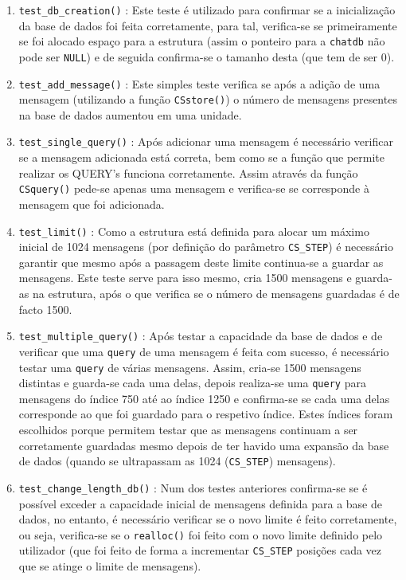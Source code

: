 \documentclass[a4paper]{article}
\begin{document}
	\begin{enumerate}
		\item \texttt{test\_db\_creation()} : Este teste é utilizado para confirmar se a inicialização da base de dados foi feita corretamente, para tal, verifica-se se primeiramente se foi alocado espaço para a estrutura (assim o ponteiro para a \texttt{chatdb} não pode ser \texttt{NULL}) e de seguida confirma-se o tamanho desta (que tem de ser 0). 
		\item \texttt{test\_add\_message()} : Este simples teste verifica se após a adição de uma mensagem (utilizando a função \texttt{CSstore()}) o número de mensagens presentes na base de dados aumentou em uma unidade. 
		\item \texttt{test\_single\_query()} : Após adicionar uma mensagem é necessário verificar se a mensagem adicionada está correta, bem como se a função que permite realizar os QUERY's funciona corretamente. Assim através da função \texttt{CSquery()} pede-se apenas uma mensagem e verifica-se se corresponde à mensagem que foi adicionada. 
		\item \texttt{test\_limit()} : Como a estrutura está definida para alocar um máximo inicial de 1024 mensagens (por definição do parâmetro \texttt{CS\_STEP}) é necessário garantir que mesmo após a passagem deste limite continua-se a guardar as mensagens. Este teste serve para isso mesmo, cria 1500 mensagens e guarda-as na estrutura, após o que verifica se o número de mensagens guardadas é de facto 1500. 
		\item \texttt{test\_multiple\_query()} : Após testar a capacidade da base de dados e de verificar que uma \texttt{query} de uma mensagem é feita com sucesso, é necessário testar uma \texttt{query} de várias mensagens. Assim, cria-se 1500 mensagens distintas e guarda-se cada uma delas, depois realiza-se uma \texttt{query} para mensagens do índice 750 até ao índice 1250 e confirma-se se cada uma delas corresponde ao que foi guardado para o respetivo índice. Estes índices foram escolhidos porque permitem testar que as mensagens continuam a ser corretamente guardadas mesmo depois de ter havido uma expansão da base de dados (quando se ultrapassam as 1024 (\texttt{CS\_STEP}) mensagens).
		\item \texttt{test\_change\_length\_db()} : Num dos testes anteriores confirma-se se é possível exceder a capacidade inicial de mensagens definida para a base de dados, no entanto, é necessário verificar se o novo limite é feito corretamente, ou seja, verifica-se se o \texttt{realloc()} foi feito com o novo limite definido pelo utilizador (que foi feito de forma a incrementar \texttt{CS\_STEP} posições cada vez que se atinge o limite de mensagens).
	\end{enumerate}
\end{document}
